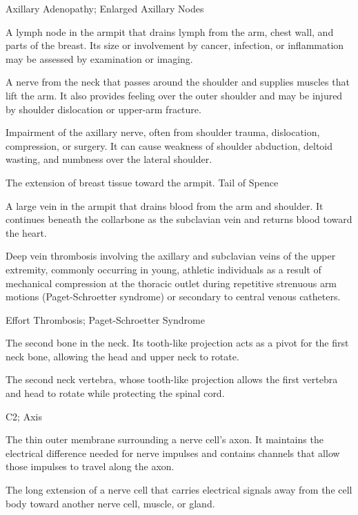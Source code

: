 \synonyms
Axillary Adenopathy; Enlarged Axillary Nodes

 A lymph node in the armpit that drains lymph from the arm, chest wall, and parts of the breast. Its size or involvement by cancer, infection, or inflammation may be assessed by examination or imaging.

 A nerve from the neck that passes around the shoulder and supplies muscles that lift the arm. It also provides feeling over the outer shoulder and may be injured by shoulder dislocation or upper-arm fracture.

 Impairment of the axillary nerve, often from shoulder trauma, dislocation, compression, or surgery. It can cause weakness of shoulder abduction, deltoid wasting, and numbness over the lateral shoulder.

 The extension of breast tissue toward the armpit.
\synonyms
Tail of Spence

 A large vein in the armpit that drains blood from the arm and shoulder. It continues beneath the collarbone as the subclavian vein and returns blood toward the heart.

 Deep vein thrombosis involving the axillary and subclavian veins of the upper extremity, commonly occurring in young, athletic individuals as a result of mechanical compression at the thoracic outlet during repetitive strenuous arm motions (Paget-Schroetter syndrome) or secondary to central venous catheters.

\synonyms
Effort Thrombosis; Paget-Schroetter Syndrome

 The second bone in the neck. Its tooth-like projection acts as a pivot for the first neck bone, allowing the head and upper neck to rotate.

 The second neck vertebra, whose tooth-like projection allows the first vertebra and head to rotate while protecting the spinal cord.

\synonyms
C2; Axis

 The thin outer membrane surrounding a nerve cell's axon. It maintains the electrical difference needed for nerve impulses and contains channels that allow those impulses to travel along the axon.

 The long extension of a nerve cell that carries electrical signals away from the cell body toward another nerve cell, muscle, or gland.

